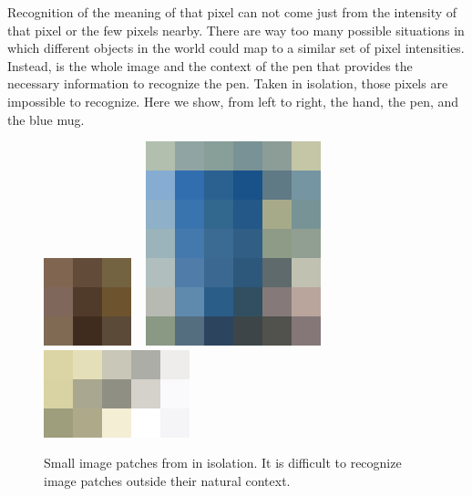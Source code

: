 Recognition of the meaning of that pixel can not come just from the intensity of that pixel or the few pixels nearby. There are way too many possible situations in which different objects in the world could map to a similar set of pixel intensities. Instead, is the whole image and the context of the pen that provides the necessary information to recognize the pen. Taken in isolation, those pixels are impossible to recognize. Here we show, from left to right, the hand, the pen, and the blue mug.


\begin{figure}[h!]
    \centerline{
        \includegraphics[width=.17\linewidth]{figures/visionscience/dalle_hand.png}
        ~
        \includegraphics[width=.34\linewidth]{figures/visionscience/dalle_mug.png}
        ~
        \includegraphics[width=.29\linewidth]{figures/visionscience/dalle_pen.png}
    }
    \caption{Small image patches from \fig{\ref{fig:pexels-retha-ferguson}} in isolation. It is difficult to recognize image patches outside their natural context.}
\end{figure}





